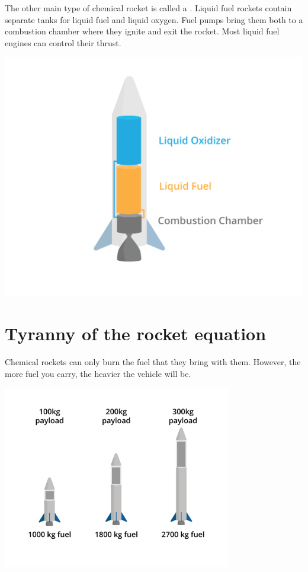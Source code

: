 The other main type of chemical rocket is called a . Liquid fuel rockets contain separate tanks for liquid fuel and liquid oxygen. Fuel pumps bring them both to a combustion chamber where they ignite and exit the rocket. Most liquid fuel engines can control their thrust. 


\includegraphics[width=1\textwidth]{liquid.png}


\section{Tyranny of the rocket equation}
	Chemical rockets can only burn the fuel that they bring with them. However, the more fuel you carry, the heavier the vehicle will be.

	\includegraphics[width=0.75\textwidth]{rocketFuelWeight.png}
 

